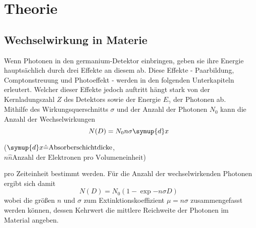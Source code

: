 \section{Theorie}
\subsection{Wechselwirkung in Materie}
Wenn Photonen in den germanium-Detektor einbringen, geben sie ihre Energie hauptsächlich durch drei Effekte an diesem ab. Diese Effekte - Paarbildung, Comptonstreuung und Photoeffekt - werden in den folgenden Unterkapiteln erleutert. Welcher dieser Effekte jedoch auftritt hängt stark von der Kernladungszahl $Z$ des Detektors sowie der Energie $E_\gamma$ der Photonen ab. \\
Mithilfe des Wirkungsquerschnitts $\sigma$ und der Anzahl der Photonen $N_0$ kann die Anzahl der Wechselwirkungen
\begin{equation}
    N(D) = N_0 n \sigma \symup{d}x
\end{equation}
\begin{center}
    \tiny($ \symup{d}x \hat{=} \text{Absorberschichtdicke}$, $n \hat{n} \text{Anzahl der Elektronen pro Volumeneinheit}$)
\end{center}
pro Zeiteinheit bestimmt werden.
Für die Anzahl der wechselwirkenden Photonen ergibt sich damit
\begin{equation}
    N(D) = N_0 \left( 1 - \exp{- n \sigma D } \right)
\end{equation}
wobei die größen $n$ und $\sigma$ zum Extinktionskoeffizient $\mu = n \sigma$ zusammengefasst werden können, dessen Kehrwert die mittlere Reichweite der Photonen im Material angeben.

